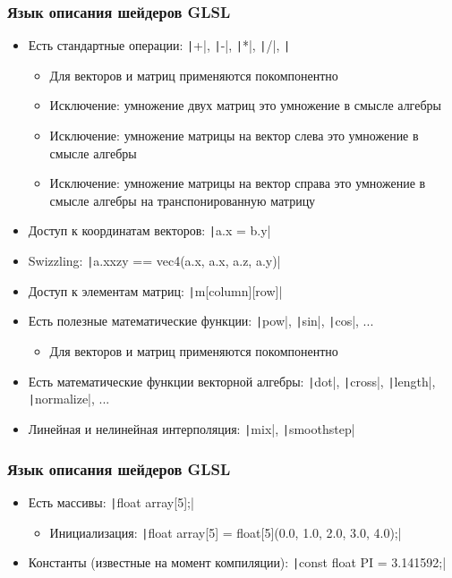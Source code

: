 \documentclass[10pt]{beamer}
\begin{document}
\begin{frame}[fragile]
\frametitle{Язык описания шейдеров GLSL}
\begin{itemize}
\item Есть стандартные операции: \texttt|+|, \texttt|-|, \texttt|*|, \texttt|/|, \texttt|%
\pause
\begin{itemize}
\item Для векторов и матриц применяются покомпонентно
\pause
\item Исключение: умножение двух матриц это умножение в смысле алгебры
\pause
\item Исключение: умножение матрицы на вектор слева это умножение в смысле алгебры
\pause
\item Исключение: умножение матрицы на вектор справа это умножение в смысле алгебры на транспонированную матрицу
\end{itemize}
\pause
\item Доступ к координатам векторов: \texttt|a.x = b.y|
\pause
\item Swizzling: \texttt|a.xxzy == vec4(a.x, a.x, a.z, a.y)|
\pause
\item Доступ к элементам матриц: \texttt|m[column][row]|
\pause
\item Есть полезные математические функции: \texttt|pow|, \texttt|sin|, \texttt|cos|, ...
\pause
\begin{itemize}
\item Для векторов и матриц применяются покомпонентно
\end{itemize}
\pause
\item Есть математические функции векторной алгебры: \texttt|dot|, \texttt|cross|, \texttt|length|, \texttt|normalize|, ...
\pause
\item Линейная и нелинейная интерполяция: \texttt|mix|, \texttt|smoothstep|
\end{itemize}
\end{frame}

\begin{frame}[fragile]
\frametitle{Язык описания шейдеров GLSL}
\begin{itemize}
\item Есть массивы: \texttt|float array[5];|
\pause
\begin{itemize}
\item Инициализация: \texttt|float array[5] = float[5](0.0, 1.0, 2.0, 3.0, 4.0);|
\end{itemize}
\pause
\item Константы (известные на момент компиляции): \texttt|const float PI = 3.141592;|
\end{itemize}
\end{frame}
\end{document}
